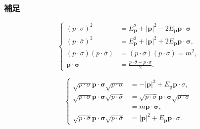 \documentclass[pdflatex,unicode,ja=standard,12pt]{beamer}
\begin{document}
\begin{frame}[noframenumbering]

  \frametitle{補足 \subsecname}
  \thispagestyle{empty}  

  \begin{equation}
    \left\{
      \begin{alignedat}{1}
        (p\cdot\sigma)^2
        &=
        E_{\mathbf{p}}^2
        +
        |\mathbf{p}|^2
        -
        2E_{\mathbf{p}}\mathbf{p}\cdot\bm{\sigma}
        \\
        (p\cdot\bar{\sigma})^2
        &=
        E_{\mathbf{p}}^2
        +
        |\mathbf{p}|^2
        +
        2E_{\mathbf{p}}\mathbf{p}\cdot\bm{\sigma}
        ,
        \\
        (p\cdot\sigma)(p\cdot\bar\sigma)
        &=
        (p\cdot\bar\sigma)(p\cdot\sigma)
        =
        m^2
        ,
        \\
        \mathbf{p}\cdot\bm{\sigma}
        &=
        \frac{p\cdot\bar{\sigma}-p\cdot\sigma}{2}
        .
      \end{alignedat}
    \right.
    \label{formula06}
  \end{equation}

  \begin{equation}
    \left\{
      \begin{alignedat}{1}
        \sqrt{p\cdot\sigma}
        \mathbf{p}\cdot\bm{\sigma}
        \sqrt{p\cdot\sigma}
        &=
        -
        |\mathbf{p}|^2
        +
        E_{\mathbf{p}}\mathbf{p}\cdot\sigma
        ,
        \\
        \sqrt{p\cdot\sigma}
        \mathbf{p}\cdot\bm{\sigma}
        \sqrt{p\cdot\bar{\sigma}}
        &=
        \sqrt{p\cdot\bar{\sigma}}
        \mathbf{p}\cdot\bm{\sigma}
        \sqrt{p\cdot\sigma}
        \\
        &=   
        m\mathbf{p}\cdot\bm{\sigma}
        ,
        \\
        \sqrt{p\cdot\bar{\sigma}}
        \mathbf{p}\cdot\bm{\sigma}
        \sqrt{p\cdot\bar{\sigma}}
        &=
        |\mathbf{p}|^2
        +
        E_{\mathbf{p}}\mathbf{p}\cdot\sigma
        .
      \end{alignedat}
    \right.
    \label{formula07}
  \end{equation}

\end{frame}
\end{document}
